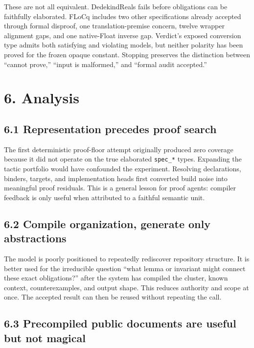 \documentclass[
  10pt,
]{article}
\begin{document}
These are not all equivalent. DedekindReals fails before obligations can
be faithfully elaborated. FLoCq includes two other specifications
already accepted through formal disproof, one translation-premise
concern, twelve wrapper alignment gaps, and one native-Float inverse
gap. Verdict's exposed conversion type admits both satisfying and
violating models, but neither polarity has been proved for the frozen
opaque constant. Stopping preserves the distinction between ``cannot
prove,'' ``input is malformed,'' and ``formal audit accepted.''

\section{6. Analysis}\label{analysis}

\subsection{6.1 Representation precedes proof
search}\label{representation-precedes-proof-search}

The first deterministic proof-floor attempt originally produced zero
coverage because it did not operate on the true elaborated
\texttt{spec\_*} types. Expanding the tactic portfolio would have
confounded the experiment. Resolving declarations, binders, targets, and
implementation heads first converted build noise into meaningful proof
residuals. This is a general lesson for proof agents: compiler feedback
is only useful when attributed to a faithful semantic unit.

\subsection{6.2 Compile organization, generate only
abstractions}\label{compile-organization-generate-only-abstractions}

The model is poorly positioned to repeatedly rediscover repository
structure. It is better used for the irreducible question ``what lemma
or invariant might connect these exact obligations?'' after the system
has compiled the cluster, known context, counterexamples, and output
shape. This reduces authority and scope at once. The accepted result can
then be reused without repeating the call.

\subsection{6.3 Precompiled public documents are useful but not
magical}\label{precompiled-public-documents-are-useful-but-not-magical}
\end{document}

